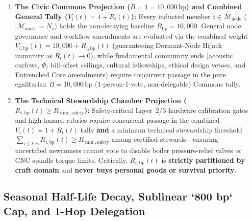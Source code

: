\begin{enumerate}
\item \textbf{The Civic Commons Projection ($B = 1 = 10{,}000\,\mathrm{bp}$) and Combined General Tally ($V_i(t) = 1 + R_i(t)$):}
        Every inducted member $i \in \mathcal{M}_{\mathrm{node}}$ ($|\mathcal{M}_{\mathrm{node}}| = N_s$)
        holds the non-decaying baseline $B_{\mathrm{bp}} = 10{,}000$. General node governance and
        workflow amendments are evaluated via the combined weight
        $V_{i,\mathrm{bp}}(t) = 10{,}000 + R_{i,\mathrm{bp}}(t)$ (guaranteeing Dormant-Node Hijack
        immunity as $R_i(t) \to 0$), while fundamental community ends (acoustic curfews, $\Phi_t$
        bill-offset ceilings, cultural fellowships, ethical design vetoes, and Entrenched Core
        amendments) require concurrent passage in the pure egalitarian $B = 10{,}000\,\mathrm{bp}$
        (1-person-1-vote, non-delegable) Commons tally.
\item \textbf{The Technical Stewardship Chamber Projection ($R_{i,\mathrm{bp}}(t) \ge R_{\min,\mathrm{safety}}$):}
        Safety-critical Layer~2/3 hardware calibration gates and high-hazard rubrics require
        concurrent passage in the combined $V_i(t) = 1 + R_i(t)$ tally \textbf{and} a minimum
        technical stewardship threshold $\sum_{i \in \text{Yes}} R_{i,\mathrm{bp}}(t) \ge
        R_{\min,\mathrm{safety}}$ among certified stewards---ensuring uncertified newcomers cannot
        vote to disable boiler pressure-relief valves or CNC spindle torque limits. Critically,
        $R_{i,\mathrm{bp}}(t)$ is \textbf{strictly partitioned by craft domain} and \textbf{never
        buys personal goods or survival priority}.
\end{enumerate}

\subsection{Seasonal Half-Life Decay, Sublinear `800 bp` Cap, and 1-Hop Delegation}

